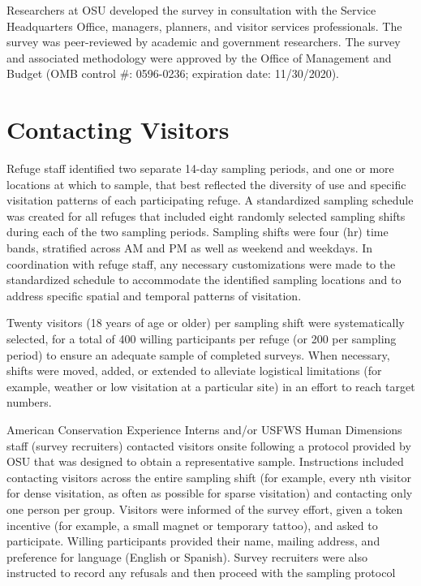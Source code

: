 \documentclass[]{book}
\begin{document}
Researchers at OSU developed the survey in consultation with the Service
Headquarters Office, managers, planners, and visitor services
professionals. The survey was peer-reviewed by academic and government
researchers. The survey and associated methodology were approved by the
Office of Management and Budget (OMB control \#: 0596-0236; expiration
date: 11/30/2020).

\section*{Contacting Visitors}\label{contacting-visitors-1}

Refuge staff identified two separate 14-day sampling periods, and one or
more locations at which to sample, that best reflected the diversity of
use and specific visitation patterns of each participating refuge. A
standardized sampling schedule was created for all refuges that included
eight randomly selected sampling shifts during each of the two sampling
periods. Sampling shifts were four (hr) time bands, stratified across AM
and PM as well as weekend and weekdays. In coordination with refuge
staff, any necessary customizations were made to the standardized
schedule to accommodate the identified sampling locations and to address
specific spatial and temporal patterns of visitation.

Twenty visitors (18 years of age or older) per sampling shift were
systematically selected, for a total of 400 willing participants per
refuge (or 200 per sampling period) to ensure an adequate sample of
completed surveys. When necessary, shifts were moved, added, or extended
to alleviate logistical limitations (for example, weather or low
visitation at a particular site) in an effort to reach target numbers.

American Conservation Experience Interns and/or USFWS Human Dimensions
staff (survey recruiters) contacted visitors onsite following a protocol
provided by OSU that was designed to obtain a representative sample.
Instructions included contacting visitors across the entire sampling
shift (for example, every nth visitor for dense visitation, as often as
possible for sparse visitation) and contacting only one person per
group. Visitors were informed of the survey effort, given a token
incentive (for example, a small magnet or temporary tattoo), and asked
to participate. Willing participants provided their name, mailing
address, and preference for language (English or Spanish). Survey
recruiters were also instructed to record any refusals and then proceed
with the sampling protocol
\end{document}
